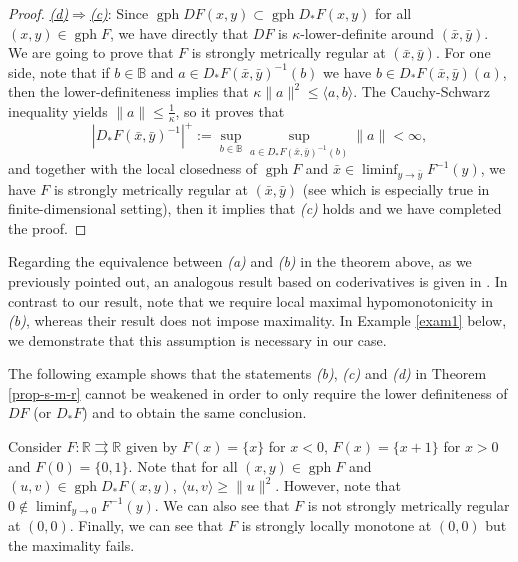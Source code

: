 \documentclass[smallextended,envcountsect,envcountsame]{svjour3}
\newcommand{\R}{\mathbb{R}}
\newcommand{\tto}{\rightrightarrows}
\newcommand{\gph}{\operatorname{gph}}
\newcommand{\1}{\mathds{1}}
\begin{document}
\begin{proof}
    \underline{\emph{(d)}$\Rightarrow$\emph{(c)}}: Since $\gph DF(x,y)\subset \gph D_\ast F(x,y)$ for all $(x,y)\in \gph F$, we have directly that $DF$ is $\kappa$-lower-definite around $(\bar x,\bar y)$. We are going to prove that $F$ is strongly metrically regular at $(\bar x,\bar y)$. For one side, note that if $b\in \mathbb{B}$ and $a\in D_\ast F(\bar x,\bar y)^{-1}(b)$ we have $b\in D_\ast F(\bar x,\bar y)(a)$, then the lower-definiteness implies that $\kappa\|a\|^2\leq \langle a,b\rangle$. The Cauchy-Schwarz inequality yields $\|a\|\leq \frac{1}{\kappa}$, so it proves that $$|D_\ast F(\bar x,\bar y)^{-1}|^+ := \sup_{b\in \mathbb{B}}\sup_{a\in D_\ast F(\bar x,\bar y)^{-1}(b)} \|a\|<\infty,$$ and together with the local closedness of $\gph F$ and $\bar x\in \liminf_{y\to\bar y} F^{-1}(y)$, we have $F$ is strongly metrically regular at $(\bar x,\bar y)$ (see \cite[Theorem 4D.1]{MR3288139} which is especially true in finite-dimensional setting), then it implies that \emph{(c)} holds and we have completed the proof.
	\end{proof}

    \begin{remark}
        Regarding the equivalence between \emph{(a)} and \emph{(b)} in the theorem above, as we previously pointed out, an analogous result based on coderivatives is given in \cite[Theorem 3.4]{MR3485980}. In contrast to our result, note that we require local maximal hypomonotonicity in \emph{(b)}, whereas their result does not impose maximality. In Example \ref{exam1} below, we demonstrate that this assumption is necessary in our case.
    \end{remark}
	
	The following example shows that the statements \emph{(b)}, \emph{(c)} and \emph{(d)} in Theorem \ref{prop-s-m-r} cannot be weakened in order to only require the lower definiteness of $DF$ (or $D_\ast F$) and to obtain the same conclusion.
	\begin{example}\label{exam1}
		Consider $F\colon \R\tto \R$ given by $F(x) = \{x\}$ for $x<0$, $F(x) = \{x+1\}$ for $x>0$ and $F(0) = \{0,1\}$. Note that for all $(x,y)\in \gph F$ and $(u,v)\in \gph D_\ast F(x,y)$, $\langle u,v\rangle\geq \|u\|^2$. However, note that $0\notin \liminf_{y\to 0}F^{-1}(y)$. We can also see that $F$ is not strongly metrically regular at $(0,0)$. Finally, we can see that $F$ is strongly locally monotone at $(0,0)$ but the maximality fails.
	\end{example}
	
\end{document}
